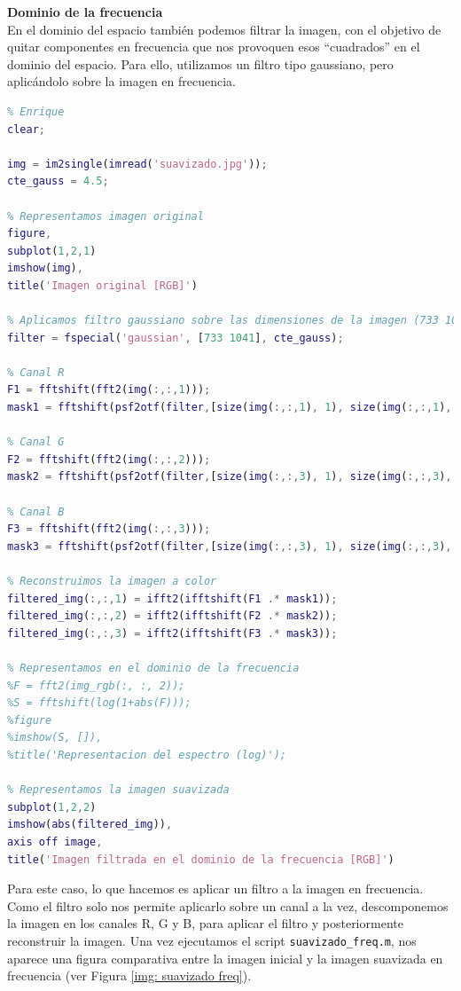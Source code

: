 \documentclass[12pt]{article}
\begin{document}
	\pagebreak
	
	\noindent \textbf{\large Dominio de la frecuencia} \\
	
	\noindent En el dominio del espacio también podemos filtrar la imagen, con el objetivo de quitar componentes en frecuencia que nos provoquen esos ``cuadrados'' en el dominio del espacio. Para ello, utilizamos un filtro tipo gaussiano, pero aplicándolo sobre la imagen en frecuencia.
	
	\begin{lstlisting}[language=Matlab, caption={Implementación suavizado en el dominio de la frecuencia en \texttt{MATLAB}}]
% 4 - Suavizado
% Enrique
clear;

img = im2single(imread('suavizado.jpg'));
cte_gauss = 4.5;

% Representamos imagen original
figure,
subplot(1,2,1)
imshow(img),
title('Imagen original [RGB]')

% Aplicamos filtro gaussiano sobre las dimensiones de la imagen (733 1041)
filter = fspecial('gaussian', [733 1041], cte_gauss);

% Canal R
F1 = fftshift(fft2(img(:,:,1)));
mask1 = fftshift(psf2otf(filter,[size(img(:,:,1), 1), size(img(:,:,1), 2)]));

% Canal G
F2 = fftshift(fft2(img(:,:,2)));
mask2 = fftshift(psf2otf(filter,[size(img(:,:,3), 1), size(img(:,:,3), 2)]));

% Canal B
F3 = fftshift(fft2(img(:,:,3)));
mask3 = fftshift(psf2otf(filter,[size(img(:,:,3), 1), size(img(:,:,3), 2)]));

% Reconstruimos la imagen a color
filtered_img(:,:,1) = ifft2(ifftshift(F1 .* mask1));
filtered_img(:,:,2) = ifft2(ifftshift(F2 .* mask2));
filtered_img(:,:,3) = ifft2(ifftshift(F3 .* mask3));

% Representamos en el dominio de la frecuencia
%F = fft2(img_rgb(:, :, 2));
%S = fftshift(log(1+abs(F)));
%figure
%imshow(S, []),
%title('Representacion del espectro (log)');

% Representamos la imagen suavizada
subplot(1,2,2)
imshow(abs(filtered_img)),
axis off image,
title('Imagen filtrada en el dominio de la frecuencia [RGB]')
	\end{lstlisting}
	
	\pagebreak
	
	\noindent Para este caso, lo que hacemos es aplicar un filtro a la imagen en frecuencia. Como el filtro solo nos permite aplicarlo sobre un canal a la vez, descomponemos la imagen en los canales R, G y B, para aplicar el filtro y posteriormente reconstruir la imagen. Una vez ejecutamos el script \texttt{suavizado\_freq.m}, nos aparece una figura comparativa entre la imagen inicial y la imagen suavizada en frecuencia (ver Figura \ref{img: suavizado freq}).
	
\end{document}
